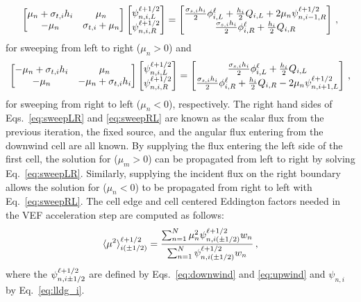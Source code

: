 	\begin{equation} \label{eq:sweepLR}
		\left[\begin{matrix}
			\mu_n + \sigma_{t,i} h_i & \mu_n  \\ 
			-\mu_n & \sigma_{t,i} + \mu_n \\ 
		\end{matrix}\right]
		\left[\begin{matrix}
			\psi_{n,i,L}^{\ell+1/2} \\ \psi_{n,i,R}^{\ell+1/2}
		\end{matrix}\right]
		= \left[\begin{matrix}
			\frac{\sigma_{s,i}h_i}{2} \phi_{i,L}^\ell + \frac{h_i}{2} Q_{i,L} + 2\mu_n \psi_{n,i-1,R}^{\ell+1/2} \\
			\frac{\sigma_{s,i}h_i}{2} \phi_{i,R}^\ell + \frac{h_i}{2} Q_{i,R} 
		\end{matrix}\right] \,, 
	\end{equation}
for sweeping from left to right ($\mu_n > 0$) and 
	\begin{equation} \label{eq:sweepRL}
		\left[\begin{matrix} 
			-\mu_n + \sigma_{t,i}h_i & \mu_n \\ 
			-\mu_n & -\mu_n + \sigma_{t,i}h_i \\ 
		\end{matrix} \right]
		\left[\begin{matrix}
			\psi_{n,i,L}^{\ell+1/2} \\ \psi_{n,i,R}^{\ell+1/2}
		\end{matrix} \right]
		= \left[\begin{matrix}
			\frac{\sigma_{s,i}h_i}{2} \phi_{i,L}^\ell + \frac{h_i}{2} Q_{i,L} \\ 
			\frac{\sigma_{s,i}h_i}{2} \phi_{i,R}^\ell + \frac{h_i}{2} Q_{i,R} - 2\mu_n \psi_{n,i+1,L}^{\ell+1/2}
		\end{matrix} \right]
		\,, 
	\end{equation}
for sweeping from right to left ($\mu_n < 0$), respectively. The right hand sides of Eqs.~\ref{eq:sweepLR} and \ref{eq:sweepRL} are known as the scalar flux from the previous iteration, the fixed source, and the angular flux entering from the downwind cell are all known. By supplying the flux entering the left side of the first cell, the solution for ($\mu_m > 0$) can be propagated from left to right by solving Eq.~\ref{eq:sweepLR}. Similarly, supplying the incident flux on the right boundary allows the solution for ($\mu_n < 0$) to be propagated from right to left with Eq.~\ref{eq:sweepRL}. The cell edge and cell centered Eddington factors needed in the VEF acceleration step are computed as follows: 
	\begin{equation} \label{lldg:edd}
		\langle \mu^2 \rangle_{i(\pm1/2)}^{\ell+1/2} = \frac{
			\sum_{n=1}^N \mu_n^2 \psi_{n,i(\pm1/2)}^{\ell+1/2} w_n
		}{
			\sum_{n=1}^N \psi_{n,i(\pm1/2)}^{\ell+1/2} w_n 
		} \,,
	\end{equation}
where the $\psi_{n,i\pm1/2}^{\ell+1/2}$ are defined by Eqs.~\ref{eq:downwind} and \ref{eq:upwind} and $\psi_{n,i}$ by Eq.~\ref{eq:lldg_i}. 
